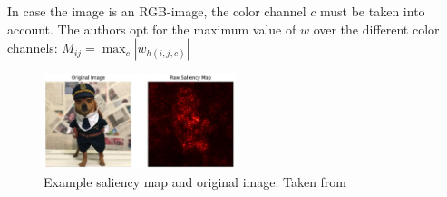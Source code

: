 In case the image is an RGB-image, the color channel $c$ must be taken into account. The authors \citep{simonyan2013deep} opt for the maximum value of $w$ over the different color channels: $M_{ij} = \max_{c} \left| w_{h(i,j,c)}\right|$

\begin{figure}[!hb]
    \centering
    \includegraphics[width=0.5\textwidth]{Grad Assignment/Images/saliency_example.png}
    \caption{Example saliency map and original image. Taken from \citep{newginsam2024}}
    \label{fig:saliency_example}
\end{figure}




